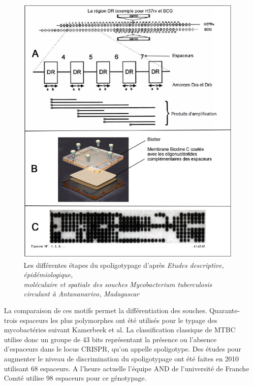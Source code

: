 \documentclass[twoside,a4paper,11pt,frenchb,openany]{report}
\begin{document}
\begin{figure}[h!]
\centering
\includegraphics[scale=0.4]{spoligo.png}
\caption{Les différentes étapes du spoligotypage d'après \textit{Etudes descriptive, épidémiologique,\\ moléculaire et spatiale des souches Mycobacterium tuberculosis circulant à Antananarivo, Madagascar}}
\end{figure}

La comparaison de ces motifs permet la différentiation des souches. Quarante-trois espaceurs les plus polymorphes ont été utilisés pour le typage des mycobactéries suivant Kamerbeek et al. La classification classique de MTBC utilise donc un groupe de 43 bits représentant la présence ou l'absence d'espaceurs dans le locus CRISPR, qu'on appelle spoligotype. Des études pour augmenter le niveau de discrimination du spoligotypage ont été faites en 2010 utilisant 68 espaceurs. A l'heure actuelle l'équipe AND de l'université de Franche Comté utilise 98 espaceurs pour ce génotypage.
\end{document}
